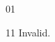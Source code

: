 \documentclass[paper=A4]{ropas-poster}
\begin{document}
\begin{postergrid}{0}{1}
\begin{posterblock}{1}{1}
Invalid.
\end{posterblock}
\end{postergrid}
\end{document}
